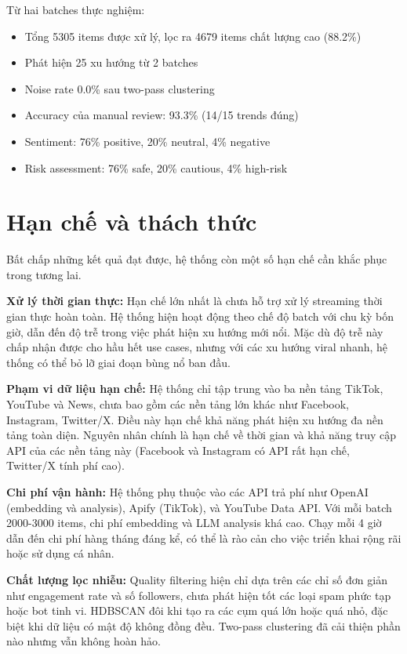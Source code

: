 Từ hai batches thực nghiệm:
\begin{itemize}
    \item Tổng 5305 items được xử lý, lọc ra 4679 items chất lượng cao (88.2\%)
    \item Phát hiện 25 xu hướng từ 2 batches
    \item Noise rate 0.0\% sau two-pass clustering
    \item Accuracy của manual review: 93.3\% (14/15 trends đúng)
    \item Sentiment: 76\% positive, 20\% neutral, 4\% negative
    \item Risk assessment: 76\% safe, 20\% cautious, 4\% high-risk
\end{itemize}

\section{Hạn chế và thách thức}

Bất chấp những kết quả đạt được, hệ thống còn một số hạn chế cần khắc phục trong tương lai.

\textbf{Xử lý thời gian thực:} Hạn chế lớn nhất là chưa hỗ trợ xử lý streaming thời gian thực hoàn toàn. Hệ thống hiện hoạt động theo chế độ batch với chu kỳ bốn giờ, dẫn đến độ trễ trong việc phát hiện xu hướng mới nổi. Mặc dù độ trễ này chấp nhận được cho hầu hết use cases, nhưng với các xu hướng viral nhanh, hệ thống có thể bỏ lỡ giai đoạn bùng nổ ban đầu.

\textbf{Phạm vi dữ liệu hạn chế:} Hệ thống chỉ tập trung vào ba nền tảng TikTok, YouTube và News, chưa bao gồm các nền tảng lớn khác như Facebook, Instagram, Twitter/X. Điều này hạn chế khả năng phát hiện xu hướng đa nền tảng toàn diện. Nguyên nhân chính là hạn chế về thời gian và khả năng truy cập API của các nền tảng này (Facebook và Instagram có API rất hạn chế, Twitter/X tính phí cao).

\textbf{Chi phí vận hành:} Hệ thống phụ thuộc vào các API trả phí như OpenAI (embedding và analysis), Apify (TikTok), và YouTube Data API. Với mỗi batch 2000-3000 items, chi phí embedding và LLM analysis khá cao. Chạy mỗi 4 giờ dẫn đến chi phí hàng tháng đáng kể, có thể là rào cản cho việc triển khai rộng rãi hoặc sử dụng cá nhân.

\textbf{Chất lượng lọc nhiễu:} Quality filtering hiện chỉ dựa trên các chỉ số đơn giản như engagement rate và số followers, chưa phát hiện tốt các loại spam phức tạp hoặc bot tinh vi. HDBSCAN đôi khi tạo ra các cụm quá lớn hoặc quá nhỏ, đặc biệt khi dữ liệu có mật độ không đồng đều. Two-pass clustering đã cải thiện phần nào nhưng vẫn không hoàn hảo.

